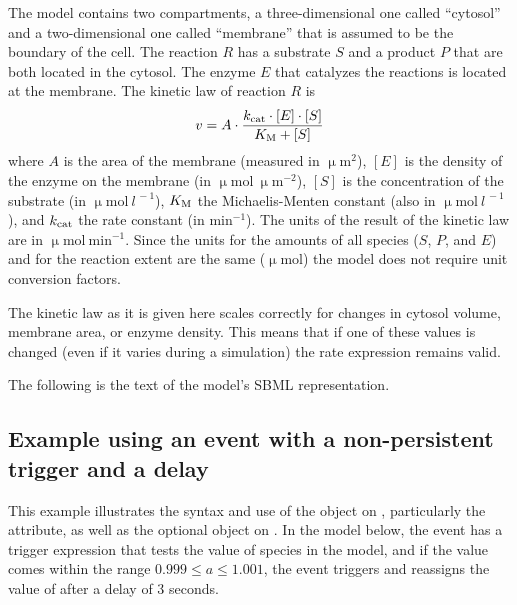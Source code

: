 The model contains two compartments, a three-dimensional one
called {}``cytosol'' and a two-dimensional one called
{}``membrane'' that is assumed to be the boundary of the cell. The
reaction $R$ has a substrate $S$ and a product $P$ that are both
located in the cytosol. The enzyme $E$ that catalyzes the
reactions is located at the membrane. The kinetic law of reaction
$R$ is\[ v=A\cdot\frac{k\sub{cat}\cdot[E]\cdot[S]}{K\sub{M}+[S]}\] where
$A$ is the area of the membrane (measured in $\upmu \mathrm{m}^{2}$), $[E]$
is the density of the enzyme on the membrane (in
$\upmu\mathrm{mol}~\upmu \mathrm{m}^{-2}$), $[S]$ is the concentration of the
substrate (in $\upmu \mathrm{mol}~l^{\,-1}$), $K\sub{M}$ the Michaelis-Menten
constant (also in $\upmu \mathrm{mol}~l^{\,-1}$), and $k\sub{cat}$ the rate
constant (in $\mathrm{min}^{-1}$). The units of the result of the kinetic
law are in $\upmu \mathrm{mol}~\mathrm{min}^{-1}$. Since the units for the amounts of
all species ($S$, $P$, and $E$) and for the reaction extent are
the same ($\upmu\mathrm{mol}$) the model does not require unit conversion
factors.

The kinetic law as it is given here scales correctly for changes
in cytosol volume, membrane area, or enzyme density. This means
that if one of these values is changed (even if it varies during a
simulation) the rate expression remains valid.

The following is the text of the model's SBML representation.

\clearpage
{}


\subsection{Example using an event with a non-persistent trigger and a delay}
\label{sec:eg:nonpersistent-trigger}

This example illustrates the syntax and use of the \Trigger object
on \Event, particularly the  attribute, as well
as the optional \Delay object on \Event.  In the model below, the
event has a trigger expression that tests the value of species
 in the model, and if the value comes within the range
$0.999 \leq a \leq 1.001$, the event triggers and reassigns the
value of  after a delay of 3 seconds.

